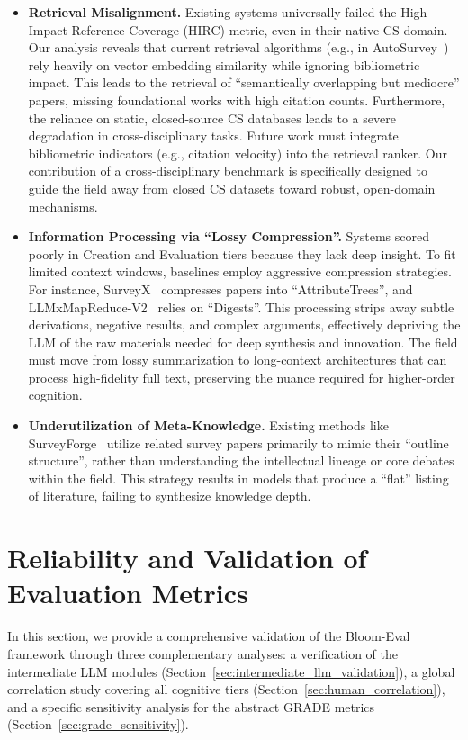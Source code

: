 \documentclass[11pt]{article}
\begin{document}
\begin{itemize}[leftmargin=*, parsep=8pt]
    \item \textbf{Retrieval Misalignment.} Existing systems universally failed the High-Impact Reference Coverage (HIRC) metric, even in their native CS domain. Our analysis reveals that current retrieval algorithms (e.g., in AutoSurvey~\cite{wang2024autosurvey}) rely heavily on vector embedding similarity while ignoring bibliometric impact. This leads to the retrieval of ``semantically overlapping but mediocre'' papers, missing foundational works with high citation counts. Furthermore, the reliance on static, closed-source CS databases leads to a severe degradation in cross-disciplinary tasks. Future work must integrate bibliometric indicators (e.g., citation velocity) into the retrieval ranker. Our contribution of a cross-disciplinary benchmark is specifically designed to guide the field away from closed CS datasets toward robust, open-domain mechanisms.

    \item \textbf{Information Processing via ``Lossy Compression''.} Systems scored poorly in Creation and Evaluation tiers because they lack deep insight. To fit limited context windows, baselines employ aggressive compression strategies. For instance, SurveyX~\cite{liang2025surveyx} compresses papers into ``AttributeTrees'', and LLMxMapReduce-V2~\cite{wang2025llmmapreducev2} relies on ``Digests''. This processing strips away subtle derivations, negative results, and complex arguments, effectively depriving the LLM of the raw materials needed for deep synthesis and innovation. The field must move from lossy summarization to long-context architectures that can process high-fidelity full text, preserving the nuance required for higher-order cognition.

    \item \textbf{Underutilization of Meta-Knowledge.} Existing methods like SurveyForge~\cite{yan2025surveyforge} utilize related survey papers primarily to mimic their ``outline structure'', rather than understanding the intellectual lineage or core debates within the field. This strategy results in models that produce a ``flat'' listing of literature, failing to synthesize knowledge depth. 
\end{itemize}

\section{Reliability and Validation of Evaluation Metrics}
\label{sec:appendix_validation}
In this section, we provide a comprehensive validation of the Bloom-Eval framework through three complementary analyses: a verification of the intermediate LLM modules (Section~\ref{sec:intermediate_llm_validation}), a global correlation study covering all cognitive tiers (Section~\ref{sec:human_correlation}), and a specific sensitivity analysis for the abstract GRADE metrics (Section~\ref{sec:grade_sensitivity}).
\end{document}
